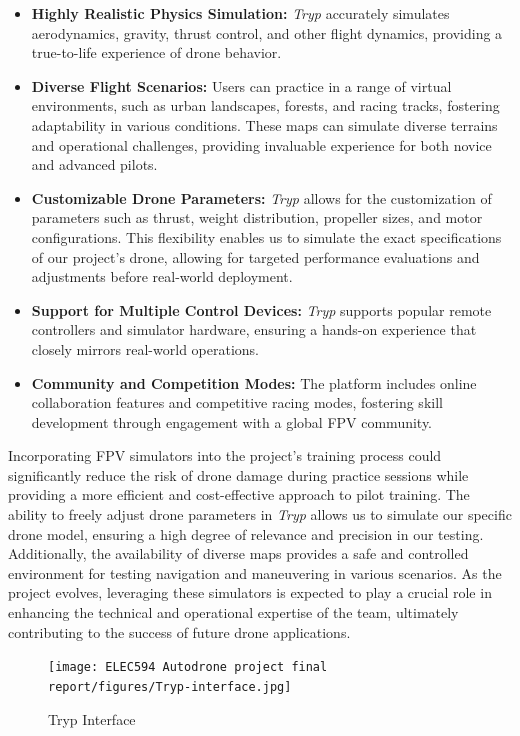 \documentclass[conference]{IEEEtran}
\begin{document}
\begin{itemize}
    \item \textbf{Highly Realistic Physics Simulation:} \textit{Tryp} accurately simulates aerodynamics, gravity, thrust control, and other flight dynamics, providing a true-to-life experience of drone behavior.
    \item \textbf{Diverse Flight Scenarios:} Users can practice in a range of virtual environments, such as urban landscapes, forests, and racing tracks, fostering adaptability in various conditions. These maps can simulate diverse terrains and operational challenges, providing invaluable experience for both novice and advanced pilots.
    \item \textbf{Customizable Drone Parameters:} \textit{Tryp} allows for the customization of parameters such as thrust, weight distribution, propeller sizes, and motor configurations. This flexibility enables us to simulate the exact specifications of our project’s drone, allowing for targeted performance evaluations and adjustments before real-world deployment.
    \item \textbf{Support for Multiple Control Devices:} \textit{Tryp} supports popular remote controllers and simulator hardware, ensuring a hands-on experience that closely mirrors real-world operations.
    \item \textbf{Community and Competition Modes:} The platform includes online collaboration features and competitive racing modes, fostering skill development through engagement with a global FPV community.
\end{itemize}

Incorporating FPV simulators into the project’s training process could significantly reduce the risk of drone damage during practice sessions while providing a more efficient and cost-effective approach to pilot training. The ability to freely adjust drone parameters in \textit{Tryp} allows us to simulate our specific drone model, ensuring a high degree of relevance and precision in our testing. Additionally, the availability of diverse maps provides a safe and controlled environment for testing navigation and maneuvering in various scenarios. As the project evolves, leveraging these simulators is expected to play a crucial role in enhancing the technical and operational expertise of the team, ultimately contributing to the success of future drone applications.

\begin{figure}[h]
    \centering
    \texttt{[image: ELEC594 Autodrone project final report/figures/Tryp-interface.jpg]}
    \caption{Tryp Interface}
    \label{fig:tryp}
\end{figure}
\end{document}
